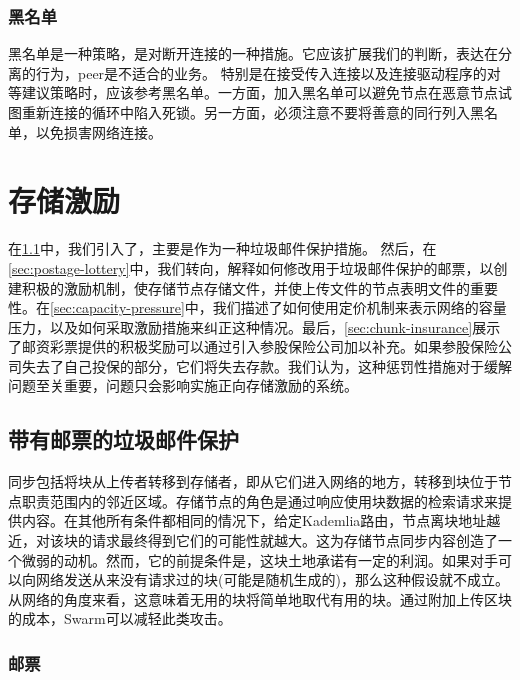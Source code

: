 \subsubsection{黑名单}

黑名单是一种策略，是对断开连接的一种措施。它应该扩展我们的判断，表达在分离的行为，peer是不适合的业务。
特别是在接受传入连接以及连接驱动程序的对等建议策略时，应该参考黑名单。一方面，加入黑名单可以避免节点在恶意节点试图重新连接的循环中陷入死锁。另一方面，必须注意不要将善意的同行列入黑名单，以免损害网络连接。



\section{存储激励\statusyellow}\label{sec:storage-incentives}


在\ref{sec:postage-stamps}中，我们引入了，主要是作为一种垃圾邮件保护措施。
然后，在\ref{sec:postage-lottery}中，我们转向，解释如何修改用于垃圾邮件保护的邮票，以创建积极的激励机制，使存储节点存储文件，并使上传文件的节点表明文件的重要性。在\ref{sec:capacity-pressure}中，我们描述了如何使用定价机制来表示网络的容量压力，以及如何采取激励措施来纠正这种情况。最后，\ref{sec:chunk-insurance}展示了邮资彩票提供的积极奖励可以通过引入参股保险公司加以补充。如果参股保险公司失去了自己投保的部分，它们将失去存款。我们认为，这种惩罚性措施对于缓解问题至关重要，问题只会影响实施正向存储激励的系统。 

\subsection{带有邮票的垃圾邮件保护}\label{sec:postage-stamps}
\green{}

同步包括将块从上传者转移到存储者，即从它们进入网络的地方，转移到块位于节点职责范围内的邻近区域。存储节点的角色是通过响应使用块数据的检索请求来提供内容。在其他所有条件都相同的情况下，给定Kademlia路由，节点离块地址越近，对该块的请求最终得到它们的可能性就越大。这为存储节点同步内容创造了一个微弱的动机。然而，它的前提条件是，这块土地承诺有一定的利润。如果对手可以向网络发送从来没有请求过的块(可能是随机生成的)，那么这种假设就不成立。从网络的角度来看，这意味着无用的块将简单地取代有用的块。通过附加上传区块的成本，Swarm可以减轻此类攻击。


\subsubsection{邮票}

